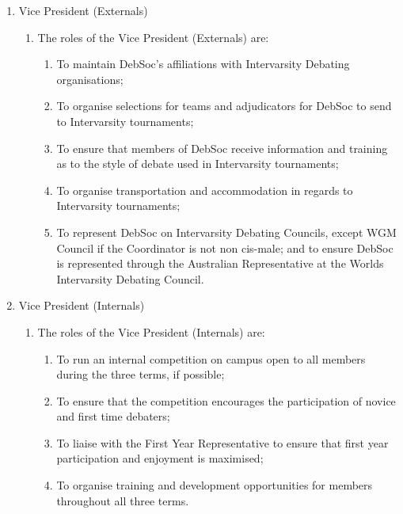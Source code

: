\begin{enumerate}
\item Vice President (Externals)
  \begin{enumerate}
  \item The roles of the Vice President (Externals) are:
    \begin{enumerate}
    \item To maintain DebSoc’s affiliations with Intervarsity Debating organisations;
    \item To organise selections for teams and adjudicators for DebSoc to send to Intervarsity tournaments;
    \item To ensure that members of DebSoc receive information and training as to the style of debate used in Intervarsity tournaments;
    \item To organise transportation and accommodation in regards to Intervarsity tournaments;
    \item To represent DebSoc on Intervarsity Debating Councils, except WGM Council if the Coordinator is not non cis-male; and to ensure DebSoc is represented through the Australian Representative at the Worlds Intervarsity Debating Council.
    \end{enumerate}
  \end{enumerate}

\item Vice President (Internals)
  \begin{enumerate}
  \item The roles of the Vice President (Internals) are:
    \begin{enumerate}
    \item To run an internal competition on campus open to all members during the three terms, if possible;
    \item To ensure that the competition encourages the participation of novice and first time debaters;
    \item To liaise with the First Year Representative to ensure that first year participation and enjoyment is maximised;
    \item To organise training and development opportunities for members throughout all three terms.
    \end{enumerate}
  \end{enumerate}


\end{enumerate}
